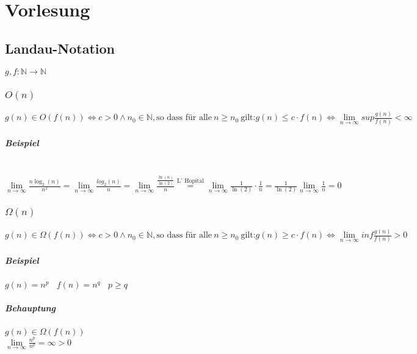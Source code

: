 \chapter{Vorlesung}


\section{Landau-Notation}

$g, f : \mathbb{N} \rightarrow \mathbb{N}$

\subsection{$O(n)$}
$g(n) \in O(f(n)) \Leftrightarrow c > 0 \land n_0 \in \mathbb{N}, \text{so dass für alle}~n \geq n_0~\text{gilt:} g(n) \leq c \cdot f(n) \Leftrightarrow \lim\limits_{n \rightarrow \infty}{sup \frac{g(n)}{f(n)}} < \infty$
\paragraph{Beispiel} \text{} \\
$\lim\limits_{n \rightarrow \infty}{\frac{n \log_2(n)}{n^2}} = \lim\limits_{n \rightarrow \infty}{\frac{log_2(n)}{n}} = \lim\limits_{n \rightarrow \infty} {\frac{\frac{\ln(n)}{\ln(2)}}{n}} \stackrel{\text{L' Hopital}}{=} \lim\limits_{n \rightarrow \infty}{\frac{1}{\ln(2)} \cdot \frac{1}{n}} = \frac{1}{\ln(2)} \lim\limits_{n \rightarrow \infty}{\frac{1}{n} = 0}$\\



\subsection{$\Omega(n)$}
$g(n) \in \Omega(f(n)) \Leftrightarrow c > 0 \land n_0 \in \mathbb{N}, \text{so dass für alle}~n \geq n_0~\text{gilt:} g(n) \geq c \cdot f(n) \Leftrightarrow \lim\limits_{n \rightarrow \infty}{inf \frac{g(n)}{f(n)}} > 0$
\paragraph{Beispiel} $g(n) = n^p~~~~f(n)=n^q~~~~p \geq q$
\paragraph{Behauptung} $g(n) \in \Omega(f(n))$\\

$\lim\limits_{n \rightarrow \infty}{\frac{n^p}{n^q}} = \infty > 0$\\


